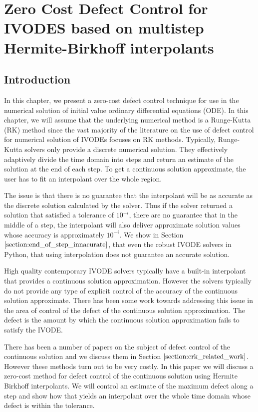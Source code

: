 \documentclass{article}
\begin{document}
\section{Zero Cost Defect Control for IVODES based on multistep Hermite-Birkhoff interpolants}
\subsection{Introduction}

In this chapter, we present a zero-cost defect control technique for use in the numerical solution of initial value ordinary differential equations (ODE). In this chapter, we will assume that the underlying numerical method is a Runge-Kutta (RK) method since the vast majority of the literature on the use of defect control for numerical solution of IVODEs focuses on RK methods. Typically, Runge-Kutta solvers only provide a discrete numerical solution. They effectively adaptively divide the time domain into steps and return an estimate of the solution at the end of each step. To get a continuous solution approximate, the user has to fit an interpolant over the whole region.

The issue is that there is no guarantee that the interpolant will be as accurate as the discrete solution calculated by the solver. Thus if the solver returned a solution that satisfied a tolerance of $10^{-i}$, there are no guarantee that in the middle of a step, the interpolant will also deliver approximate solution values whose accuracy is approximately $10^{-i}$. We show in Section $\ref{section:end_of_step_innacurate}$, that even the robust IVODE solvers in Python, that using interpolation does not guarantee an accurate solution. 

High quality contemporary IVODE solvers typically have a built-in interpolant that provides a continuous solution approximation. However the solvers typically do not provide any type of explicit control of the accuracy of the continuous solution approximate. There has been some work towards addressing this issue in the area of control of the defect of the continuous solution approximation. The defect is the amount by which the continuous solution approximation fails to satisfy the IVODE. 

There has been a number of papers on the subject of defect control of the continuous solution and we discuss them in Section $\ref{section:crk_related_work}$. However these methods turn out to be very costly. In this paper we will discuss a zero-cost method for defect control of the continuous solution using Hermite Birkhoff interpolants. We will control an estimate of the maximum defect along a step and show how that yields an interpolant over the whole time domain whose defect is within the tolerance.
\end{document}
